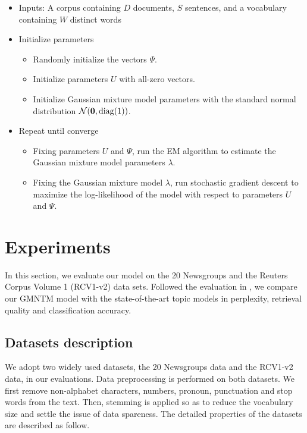 \documentclass[english,letter]{article}
\renewcommand\[{\begin{equation}}
\renewcommand\]{\end{equation}}
\begin{document}
\begin{algorithm}
\begin{itemize}
\item Inputs: A corpus containing $D$ documents, $S$ sentences, and a
vocabulary containing $W$ distinct words
\item Initialize parameters

\begin{itemize}
\item Randomly initialize the vectors $\varPsi$.
\item Initialize parameters $U$ with all-zero vectors.
\item Initialize Gaussian mixture model parameters with the standard normal
distribution ${\cal N}(\bm{0},{\rm diag}(1))$.
\end{itemize}
\item Repeat until converge

\begin{itemize}
\item Fixing parameters $U$ and $\varPsi$, run the EM algorithm to estimate
the Gaussian mixture model parameters $\lambda$.
\item Fixing the Gaussian mixture model $\lambda$, run stochastic gradient
descent to maximize the log-likelihood of the model with respect to
parameters $U$ and $\varPsi$.
\end{itemize}
\end{itemize}
\protect\caption{Inference Algorithm}
\end{algorithm}



\section{Experiments}

In this section, we evaluate our model on the 20 Newsgroups and the
Reuters Corpus Volume 1 (RCV1-v2) data sets. Followed the evaluation
in \cite{srivastava2013modeling}, we compare our GMNTM model with
the state-of-the-art topic models in perplexity, retrieval quality
and classification accuracy.


\subsection{Datasets description}

We adopt two widely used datasets, the 20 Newsgroups data and the
RCV1-v2 data, in our evaluations. Data preprocessing is performed
on both datasets. We first remove non-alphabet characters, numbers,
pronoun, punctuation and stop words from the text. Then, stemming
is applied so as to reduce the vocabulary size and settle the issue
of data spareness. The detailed properties of the datasets are described
as follow.
\end{document}
